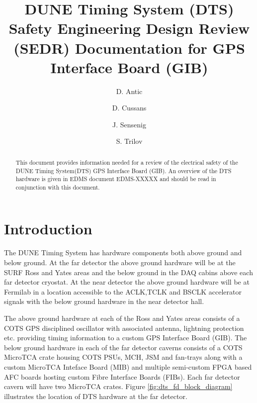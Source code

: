 \documentclass[fleqn,12pt,a4paper]{olplainarticle}
\title{DUNE Timing System (DTS) Safety Engineering Design Review (SEDR) Documentation for GPS Interface Board (GIB)}
\author[1]{D. Antic}
\author[1]{D. Cussans}
\author[2]{J. Sensenig}
\author[1]{S. Trilov}
\affil[1]{H.H. Wills Physics Laboratory, Bristol, UK}
\affil[2]{David Rittenhouse Laboratory, Philadelphia, USA}
\begin{document}

\begin{abstract}
This document provides information needed for a review of the electrical safety of the DUNE Timing System(DTS) GPS Interface Board (GIB). An overview of the DTS hardware is given in EDMS document EDMS-XXXXX and should be read in conjunction with this document.
\end{abstract}


\flushbottom

\maketitle

\thispagestyle{empty}

\section{Introduction}

The DUNE Timing System has hardware components both above ground and below ground. At the far detector the above ground hardware will be at the SURF Ross and Yates areas and the below ground in the DAQ cabins above each far detector cryostat. At the near detector the above ground hardware will be at Fermilab in a location accessible to the ACLK,TCLK and BSCLK accelerator signals with the below ground hardware in the near detector hall.

The above ground hardware at each of the Ross and Yates areas consists of a COTS GPS disciplined oscillator with associated antenna, lightning protection etc. providing timing information to a custom GPS Interface Board (GIB). The below ground hardware in each of the far detector caverns consists of a COTS MicroTCA crate housing COTS PSUs, MCH, JSM and fan-trays along with a custom MicroTCA Inteface Board (MIB) and multiple semi-custom FPGA based AFC boards hosting custom Fibre Interface Boards (FIBs). Each far detector cavern will have two MicroTCA crates.
Figure \ref{fig:dts_fd_block_diagram} illustrates the location of DTS hardware at the far detector.
\end{document}
